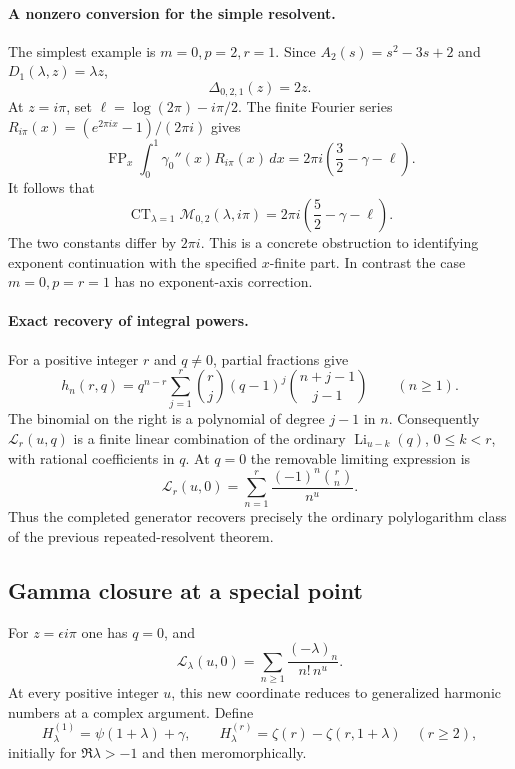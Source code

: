 \documentclass[11pt]{article}
\numberwithin{equation}{section}
\theoremstyle{plain}
\theoremstyle{definition}
\theoremstyle{remark}
\begin{document}
\paragraph{A nonzero conversion for the simple resolvent.}
The simplest example is \(m=0,p=2,r=1\).  Since
\(A_2(s)=s^2-3s+2\) and \(D_1(\lambda,z)=\lambda z\),
\[
 \Delta_{0,2,1}(z)=2z.
\]
At \(z=i\pi\), set \(\ell=\log(2\pi)-i\pi/2\).
The finite Fourier series
\(R_{i\pi}(x)=(e^{2\pi ix}-1)/(2\pi i)\) gives
\[
 \operatorname{FP}_x\int_0^1\gamma_0''(x)R_{i\pi}(x)\,dx
       =2\pi i\left(\frac32-\gamma-\ell\right).
\]
It follows that
\begin{equation}\label{bhr:cxp:eq:noncommute}
 \operatorname{CT}_{\lambda=1}
       \mathcal M_{0,2}(\lambda,i\pi)
       =2\pi i\left(\frac52-\gamma-\ell\right).
\end{equation}
The two constants differ by \(2\pi i\).  This is a concrete
obstruction to identifying exponent continuation with the
specified \(x\)-finite part.  In contrast the case
\(m=0,p=r=1\) has no exponent-axis correction.

\paragraph{Exact recovery of integral powers.}
For a positive integer \(r\) and \(q\ne0\), partial fractions give
\[
 h_n(r,q)=q^{n-r}
   \sum_{j=1}^r\binom rj(q-1)^j
                    \binom{n+j-1}{j-1}\qquad(n\ge1).
\]
The binomial on the right is a polynomial of degree \(j-1\) in
\(n\).  Consequently \(\mathcal L_r(u,q)\) is a finite linear
combination of the ordinary \(\operatorname{Li}_{u-k}(q)\),
\(0\le k<r\), with rational coefficients in \(q\).
At \(q=0\) the removable limiting expression is
\[
 \mathcal L_r(u,0)
       =\sum_{n=1}^r\frac{(-1)^n\binom rn}{n^u}.
\]
Thus the completed generator recovers precisely the ordinary
polylogarithm class of the previous repeated-resolvent theorem.

\subsection{Gamma closure at a special point}

For \(z=\epsilon i\pi\) one has \(q=0\), and
\[
 \mathcal L_\lambda(u,0)
       =\sum_{n\ge1}\frac{(-\lambda)_n}{n!\,n^u}.
\]
At every positive integer \(u\), this new coordinate reduces to
generalized harmonic numbers at a complex argument.  Define
\[
 H_\lambda^{(1)}=\psi(1+\lambda)+\gamma,\qquad
 H_\lambda^{(r)}=\zeta(r)-\zeta(r,1+\lambda)\quad(r\ge2),
\]
initially for \(\Re\lambda>-1\) and then meromorphically.
\end{document}
